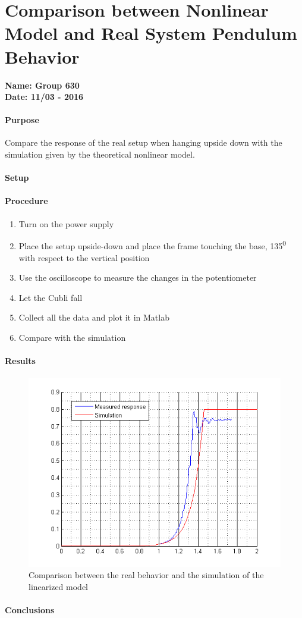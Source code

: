 \chapter{Comparison between Nonlinear Model and Real System Pendulum Behavior}\label{comparisonModelReal} 
\textbf{Name: Group 630}\\
\textbf{Date: 11/03 - 2016}

\subsubsection{Purpose}
Compare the response of the real setup when hanging upside down with the simulation given by the theoretical nonlinear model.

\subsubsection{Setup}
\subsubsection{Procedure}
\begin{enumerate}
	\item Turn on the power supply
	\item Place the setup upside-down and place the frame touching the base, \si{135^0} with respect to the vertical position
	\item Use the oscilloscope to measure the changes in the potentiometer 
	\item Let the Cubli fall
	\item Collect all the data and plot it in Matlab
	\item Compare with the simulation 
	
\end{enumerate}

\subsubsection{Results}
\begin{figure}[H] 
	\centering 
	\includegraphics[scale=0.9]{figures/comparisonRealModel}
	\caption{Comparison between the real behavior and the simulation of the linearized model}
	\label{comparisonRealModel}
\end{figure} 

\subsubsection{Conclusions}